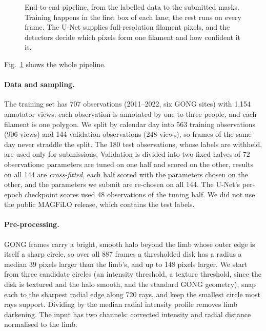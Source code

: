 \documentclass[sigconf]{acmart}
\begin{document}
\begin{figure}[t]
\caption{End-to-end pipeline, from the labelled data to the submitted masks. Training happens in the first box of each lane; the rest runs on every frame. The U-Net supplies full-resolution filament pixels, and the detectors decide which pixels form one filament and how confident it is.}
\label{fig:pipeline}
\end{figure}

Fig.~\ref{fig:pipeline} shows the whole pipeline.

\paragraph{Data and sampling.} The training set has 707 observations (2011--2022, six GONG sites) with 1{,}154 annotator views: each observation is annotated by one to three people, and each filament is one polygon. We split by calendar day into 563 training observations (906 views) and 144 validation observations (248 views), so frames of the same day never straddle the split. The 180 test observations, whose labels are withheld, are used only for submissions. Validation is divided into two fixed halves of 72 observations: parameters are tuned on one half and scored on the other, results on all 144 are \emph{cross-fitted}, each half scored with the parameters chosen on the other, and the parameters we submit are re-chosen on all 144. The U-Net's per-epoch checkpoint scores used 48 observations of the tuning half. We did not use the public MAGFiLO release, which contains the test labels.

\paragraph{Pre-processing.} GONG frames carry a bright, smooth halo beyond the limb whose outer edge is itself a sharp circle, so over all 887 frames a thresholded disk has a radius a median 39 pixels larger than the limb's, and up to 148 pixels larger. We start from three candidate circles (an intensity threshold, a texture threshold, since the disk is textured and the halo smooth, and the standard GONG geometry), snap each to the sharpest radial edge along 720 rays, and keep the smallest circle most rays support. Dividing by the median radial intensity profile removes limb darkening. The input has two channels: corrected intensity and radial distance normalised to the limb.
\end{document}
